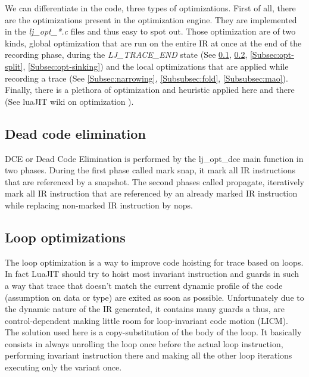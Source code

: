 
We can differentiate in the code, three types of optimizations.
First of all, there are the optimizations present in the optimization engine.
They are implemented in the \emph{lj\_opt\_*.c} files and thus easy to spot out.
Those optimization are of two kinds, global optimization that are run on the
entire IR at once at the end of the recording phase, during the
\emph{LJ\_TRACE\_END} state (See \ref{Subsec:opt-dce}, \ref{Subsec:opt-loop},
\ref{Subsec:opt-split}, \ref{Subsec:opt-sinking}) and the local optimizations
that are applied while recording a trace (See \ref{Subsec:narrowing},
\ref{Subsubsec:fold}, \ref{Subsubsec:mao}). Finally, there is a plethora of
optimization and heuristic applied here and there (See luaJIT wiki on
optimization \cite{luajit-opt}).


\subsection{Dead code elimination}
\label{Subsec:opt-dce}

DCE or Dead Code Elimination is performed by the lj\_opt\_dce main function
in two phases. During the first phase called mark snap, it mark all IR
instructions that are referenced by a snapshot. The second phases called
propagate, iteratively mark all IR instruction that are referenced by an already
marked IR instruction while replacing non-marked IR instruction by nops.


\subsection{Loop optimizations}
\label{Subsec:opt-loop}

The loop optimization is a way to improve code hoisting for trace based on
loops. In fact LuaJIT should try to hoist most invariant instruction and guards
in such a way that trace that doesn't match the current dynamic profile of
the code (assumption on data or type) are exited as soon as possible.
Unfortunately due to the dynamic nature of the IR generated, it contains many
guards a thus, are control-dependent making little room for loop-invariant
code motion (LICM). The solution used here is a copy-substitution of the body
of the loop. It basically consists in always unrolling the loop once before the
actual loop instruction, performing invariant instruction there and making
all the other loop iterations executing only the variant once.

